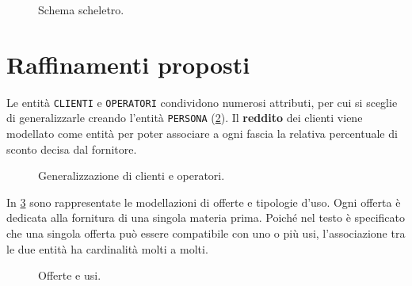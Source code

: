 \documentclass[a4paper,12pt]{report}
\begin{document}
\begin{figure}[H]
\centering{}
\caption{Schema scheletro.}
\label{fig:barebones}
\end{figure}

\section{Raffinamenti proposti}
Le entità \texttt{CLIENTI} e \texttt{OPERATORI} condividono numerosi attributi, per cui si sceglie di generalizzarle creando l'entità \texttt{PERSONA} (\cref{fig:persons}).
\newline
Il \textbf{reddito} dei clienti viene modellato come entità per poter associare a ogni fascia la relativa percentuale di sconto decisa dal fornitore.

\begin{figure}[H]
\centering{}
%
\caption{Generalizzazione di clienti e operatori.}
\label{fig:persons}
\end{figure}

In \cref{fig:plans-uses} sono rappresentate le modellazioni di offerte e tipologie d'uso. Ogni offerta è dedicata alla fornitura di una singola materia prima. Poiché nel testo è specificato che una singola offerta può essere compatibile con uno o più usi, l'associazione tra le due entità ha cardinalità molti a molti.

\begin{figure}[H]
\centering{}
%
\caption{Offerte e usi.}
\label{fig:plans-uses}
\end{figure}
\end{document}
